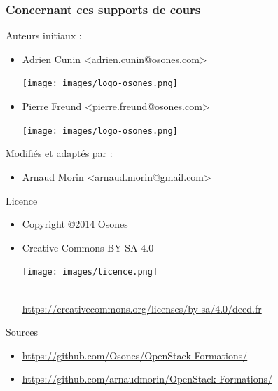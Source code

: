   \begin{frame}
    \frametitle{Concernant ces supports de cours}
    Auteurs initiaux :
    \begin{itemize}
      \item Adrien Cunin \textless adrien.cunin@osones.com\textgreater 
        \begin{minipage}[c]{1.5cm}
          \texttt{[image: images/logo-osones.png]}
        \end{minipage}
      \item Pierre Freund \textless pierre.freund@osones.com\textgreater
        \begin{minipage}[c]{1.5cm}
          \texttt{[image: images/logo-osones.png]}
        \end{minipage}
    \end{itemize}
    
    \vspace{0.3cm}
    Modifiés et adaptés par :
    \begin{itemize}
      \item Arnaud Morin \textless arnaud.morin@gmail.com\textgreater
    \end{itemize}
    
    \vspace{0.3cm}
    Licence
    \begin{itemize}
      \item Copyright \copyright{2014 Osones}
      \item Creative Commons BY-SA 4.0 
        \begin{minipage}[c]{3cm}
          \texttt{[image: images/licence.png]} 
        \end{minipage}\\
        \url{https://creativecommons.org/licenses/by-sa/4.0/deed.fr}
    \end{itemize}
    
    \vspace{0.3cm}
    Sources
    \begin{itemize}
      \item \url{https://github.com/Osones/OpenStack-Formations/}
      \item \url{https://github.com/arnaudmorin/OpenStack-Formations/}
    \end{itemize}
  \end{frame}


